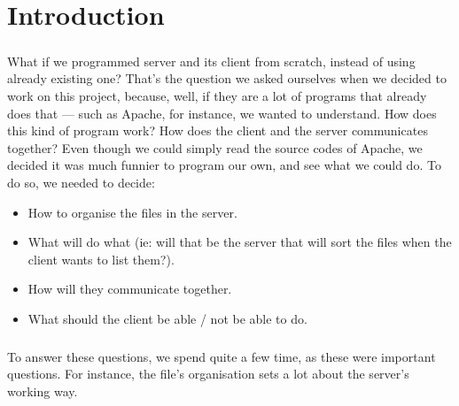 \documentclass[12pt,a4paper,twoside]{article}
\begin{document}
	\maketitle{}
	\renewcommand{\contentsname}{Sommaire} %
	\tableofcontents{}
	\newpage{}
	\section{Introduction} %
		\subparagraph*{}
			What if we programmed server and its client from scratch, instead of using already existing one? That's the question we asked ourselves when we decided to work on this project, because, well, if they are a lot of programs	that already does that — such as Apache, for instance, we wanted to understand. How does this kind of program work? How does the client and the server communicates together? Even though we could simply read the source codes of Apache, we decided it was much funnier to program our own, and see what we could do. To do so, we needed to decide:
			\begin{itemize}
				\item{} How to organise the files in the server.
				\item{} What will do what (ie: will that be the server that will sort the files when the client wants to list them?).
				\item{} How will they communicate together.
				\item{} What should the client be able / not be able to do.
			\end{itemize}
		\subparagraph*{}
			To answer these questions, we spend quite a few time, as these were important questions. For instance, the file's organisation sets a lot about the server's working way.
\end{document}
